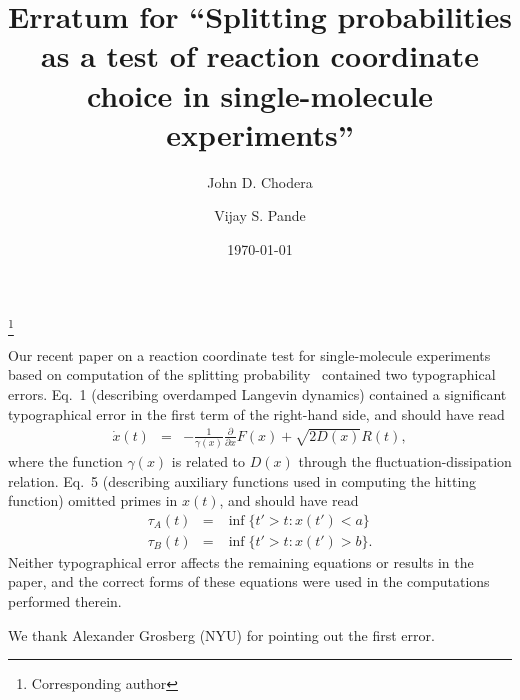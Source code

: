 \documentclass[aps,prl,twocolumn,superscriptaddress,floatfix]{revtex4-1}
\begin{document}

\title{Erratum for ``Splitting probabilities as a test of reaction coordinate choice in single-molecule experiments''}

 \author{John D. Chodera}
 
\author{Vijay S. Pande}
 \thanks{Corresponding author}

\date{\today}

\maketitle


Our recent paper on a reaction coordinate test for single-molecule experiments based on computation of the splitting probability~\cite{chodera-pande:prl:2011:splitting} contained two typographical errors.
Eq.~1 (describing overdamped Langevin dynamics) contained a significant typographical error in the first term of the right-hand side, and should have read
\begin{eqnarray}
\dot{x}(t) &=& - \frac{1}{\gamma(x)} \frac{\partial}{\partial x}F(x) + \sqrt{2 D(x)} R(t) \nonumber,
\end{eqnarray}
where the function $\gamma(x)$ is related to $D(x)$ through the fluctuation-dissipation relation.
Eq.~5 (describing auxiliary functions used in computing the hitting function) omitted primes in $x(t)$, and should have read
\begin{eqnarray}
\tau_A(t) &=& \inf \{ t' > t : x(t') < a \} \nonumber \\
\tau_B(t) &=& \inf \{ t' > t : x(t') > b \} \nonumber .
\end{eqnarray}
Neither typographical error affects the remaining equations or results in the paper, and the correct forms of these equations were used in the computations performed therein.

We thank Alexander Grosberg (NYU) for pointing out the first error.


\end{document}
